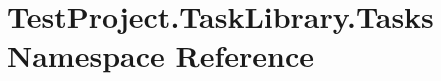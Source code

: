 \hypertarget{namespace_test_project_1_1_task_library_1_1_tasks}{}\section{Test\+Project.\+Task\+Library.\+Tasks Namespace Reference}
\label{namespace_test_project_1_1_task_library_1_1_tasks}
